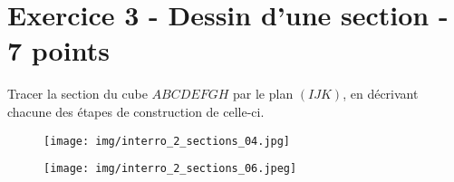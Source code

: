 \documentclass{exam}
\begin{document}
\section*{Exercice 3 - Dessin d'une section - 7 points}

\begin{questions}

  \question[7]  Tracer la section du cube $ABCDEFGH$ par le plan $(IJK)$, en décrivant chacune des étapes de construction de celle-ci.
  
  \begin{figure}[H]
    \centering
    \texttt{[image: img/interro\_2\_sections\_04.jpg]}
    \captionsetup{labelformat=empty}
    \caption{\label{}}
  \end{figure}
  \begin{solution}
    \begin{figure}[H]
      \centering
      \texttt{[image: img/interro\_2\_sections\_06.jpeg]}
      \captionsetup{labelformat=empty}
      \caption{\label{}}
    \end{figure}
  \end{solution}

\end{questions}
\end{document}
